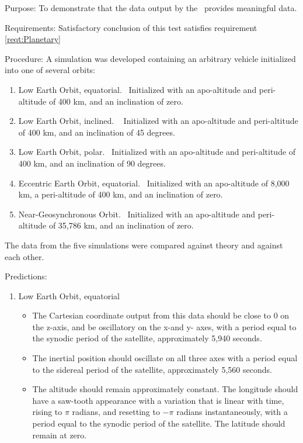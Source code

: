 \begin{description}
\item{Purpose:}\newline
To demonstrate that the data output by the \PlanetaryDesc\ provides meaningful data.

\item{Requirements:}\newline
Satisfactory conclusion of this test satisfies requirement \ref{reqt:Planetary}

\item{Procedure:}\newline
A simulation was developed containing an arbitrary vehicle initialized into one of several orbits:
\begin{enumerate}
 \item {Low Earth Orbit, equatorial.}\ \newline  
Initialized with an apo-altitude and peri-altitude of 400 km, and an inclination of zero.
 \item {Low Earth Orbit, inclined.}  \ \newline
Initialized with an apo-altitude and peri-altitude of 400 km, and an inclination of 45 degrees.
 \item {Low Earth Orbit, polar.}\ \newline
  Initialized with an apo-altitude and peri-altitude of 400 km, and an inclination of 90 degrees.
 \item {Eccentric Earth Orbit, equatorial.}\ \newline
  Initialized with an apo-altitude of 8,000 km, a peri-altitude of 400 km, and an inclination of zero.
 \item {Near-Geosynchronous Orbit.}\ \newline
  Initialized with an apo-altitude and peri-altitude of 35,786 km, and an inclination of zero.
\end{enumerate}
The data from the five simulations were compared against theory and against each other. 


\item{Predictions:}
\begin{enumerate}
 \item {Low Earth Orbit, equatorial}
\begin{itemize}
\item{}The Cartesian coordinate output from this data should be close to 0 on the z-axis, and be oscillatory on the x-and y- axes, with a period equal to the synodic period of the satellite, approximately 5,940 seconds.
\item{}The inertial position should oscillate on all three axes with a period equal to the sidereal period of the satellite, approximately 5,560 seconds.
\item{}The altitude should remain approximately constant. The longitude should have a saw-tooth appearance with a variation that is linear with time, rising to $\pi$ radians, and resetting to $-\pi$ radians instantaneously, with a period equal to the synodic period of the satellite. The latitude should remain at zero.
\end{itemize}


\end{enumerate}
\end{description}

